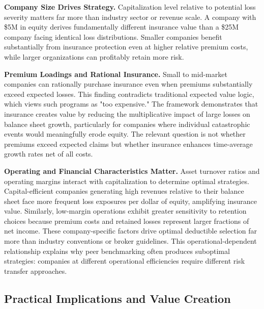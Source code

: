 \documentclass[11pt,letterpaper]{article}
\begin{document}
\vspace{\baselineskip}

\textbf{Company Size Drives Strategy.} Capitalization level relative to potential loss severity matters far more than industry sector or revenue scale. A company with \$5M in equity derives fundamentally different insurance value than a \$25M company facing identical loss distributions. Smaller companies benefit substantially from insurance protection even at higher relative premium costs, while larger organizations can profitably retain more risk.

\vspace{\baselineskip}

\textbf{Premium Loadings and Rational Insurance.} Small to mid-market companies can rationally purchase insurance even when premiums substantially exceed expected losses. This finding contradicts traditional expected value logic, which views such programs as "too expensive." The framework demonstrates that insurance creates value by reducing the multiplicative impact of large losses on balance sheet growth, particularly for companies where individual catastrophic events would meaningfully erode equity. The relevant question is not whether premiums exceed expected claims but whether insurance enhances time-average growth rates net of all costs.

\vspace{\baselineskip}

\textbf{Operating and Financial Characteristics Matter.} Asset turnover ratios and operating margins interact with capitalization to determine optimal strategies. Capital-efficient companies generating high revenues relative to their balance sheet face more frequent loss exposures per dollar of equity, amplifying insurance value. Similarly, low-margin operations exhibit greater sensitivity to retention choices because premium costs and retained losses represent larger fractions of net income. These company-specific factors drive optimal deductible selection far more than industry conventions or broker guidelines. This operational-dependent relationship explains why peer benchmarking often produces suboptimal strategies: companies at different operational efficiencies require different risk transfer approaches.

\subsection{Practical Implications and Value Creation}
\end{document}
